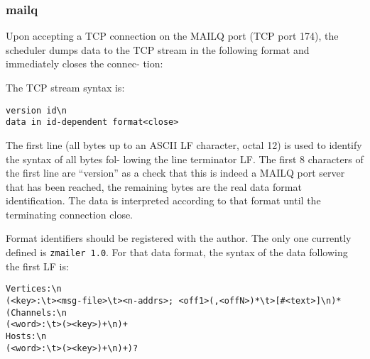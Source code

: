 \subsubsection{mailq}



Upon  accepting a  TCP  connection on the MAILQ port (TCP
port 174), the scheduler dumps data to the TCP  stream  in
the  following  format  and immediately closes the connec-
tion:

The TCP stream syntax is:
\begin{verbatim}
version id\n
data in id-dependent format<close>
\end{verbatim}


The first line (all bytes up to an ASCII LF character,
octal 12) is used to identify the syntax of all bytes fol-
lowing the line terminator LF.  The first 8 characters  of
the first line are ``version'' as a check that this is
indeed a MAILQ port server that has been reached, the
remaining  bytes are the real data format identification.
The data is interpreted according to that format until the
terminating connection close.

Format identifiers should be registered with the author.
The only one currently defined is {\tt zmailer 1.0}. For that
data format, the syntax of the data following the first LF
is:
\begin{verbatim}
Vertices:\n
(<key>:\t><msg-file>\t><n-addrs>; <off1>(,<offN>)*\t>[#<text>]\n)*
(Channels:\n
(<word>:\t>(><key>)+\n)+
Hosts:\n
(<word>:\t>(><key>)+\n)+)?
\end{verbatim}

